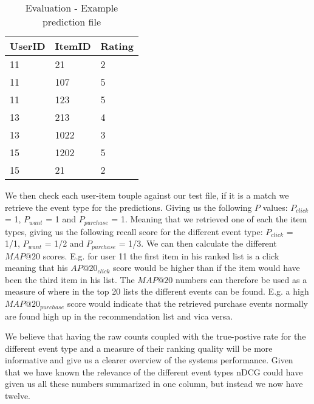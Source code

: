 \begin{table}[H]
\centering
	\begin{tabular}{*{3}l}
	\toprule
	UserID	&	ItemID	 &  Rating  	\\ \midrule
	\rowcolor{Gray}
	11		&	21		 &	2			\\
	11		&	107		 &	5			\\
	11		&	123		 &	5			\\
	\rowcolor{Gray}
	13		&	213		 &	4			\\
	13		&	1022	 &  3			\\
	15		&	1202	 &  5			\\
	\rowcolor{Gray}
	15		&	21		 &  2			\\
\bottomrule
\end{tabular}
\caption{Evaluation - Example prediction file}
\end{table}

We then check each user-item touple against our test file, if it is a match we retrieve the event type for the predictions.  Giving us the following $P$ values: $P_{click}$ = 1, $P_{want}$ = 1 and $P_{purchase}$ = 1. Meaning that we retrieved one of each the item types, giving us the following recall score for the different event type: $P_{click}$ = 1/1, $P_{want}$ = 1/2 and $P_{purchase}$ = 1/3. We can then calculate the different $MAP@20$ scores. E.g. for user 11 the first item in his ranked list is a click meaning that his $AP@20_{click}$ score would be higher than if the item would have been the third item in his list. The $MAP@20$ numbers can therefore be used as a measure of where in the top 20 lists the different events can be found. E.g. a high $MAP@20_{purchase}$ score would indicate that the retrieved purchase events
normally are found high up in the recommendation list and vica versa.

We believe that having the raw counts coupled with the true-postive rate for the different event type and a measure of their ranking quality will be more informative and give us a clearer overview of the systems performance. Given that we have known the relevance of the different event types nDCG could have given us all these numbers summarized in one column, but instead we now have twelve.



